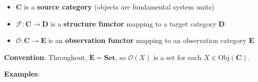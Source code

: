\documentclass[
]{article}
\providecommand{\tightlist}{%
  \setlength{\itemsep}{0pt}\setlength{\parskip}{0pt}}
\begin{document}
\begin{itemize}
\tightlist
\item
  \(\mathbf{C}\) is a \textbf{source category} (objects are fundamental
  system units)
\item
  \(\mathcal{F}: \mathbf{C} \to \mathbf{D}\) is a \textbf{structure
  functor} mapping to a target category \(\mathbf{D}\)
\item
  \(\mathcal{O}: \mathbf{C} \to \mathbf{E}\) is an \textbf{observation
  functor} mapping to an observation category \(\mathbf{E}\)
\end{itemize}

\textbf{Convention}: Throughout, \(\mathbf{E} = \mathbf{Set}\), so
\(\mathcal{O}(X)\) is a set for each \(X \in \text{Obj}(\mathbf{C})\).

\textbf{Examples}:
\end{document}
